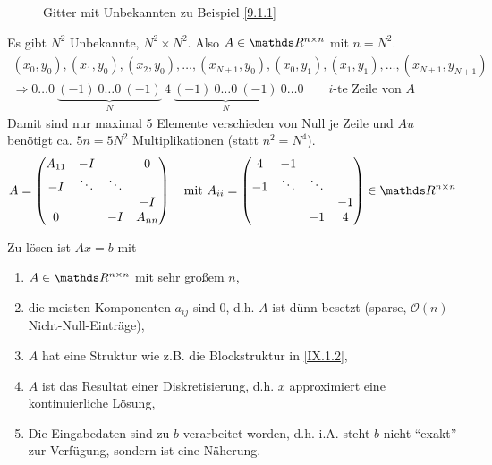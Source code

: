 \begin{Bspe}
\begin{figure}
\begin{image}{Gitter mit Unbekannten zu Beispiel \ref{9.1.1}}
    \end{image}\label{im9.1.2}
  \end{figure}
  Es gibt $N^2$ Unbekannte, $N^2\times N^2$.
  Also $A\in\R^{n\times n}$ mit $n=N^2$.
  \begin{gather*}
    (x_0,y_0),(x_1,y_0),(x_2,y_0),
    \dotsc,(x_{N+1},y_0),(x_0,y_1),(x_1,y_1),
    \dotsc,(x_{N+1},y_{N+1})\\
    \Rightarrow 0\dotsc0~\underbrace{(-1)~0\dotsc0~(-1)}_{N}~4~
    \underbrace{(-1)~0\dotsc0~(-1)}_{N}~0\dotsc0
    \qquad \text{$i$-te Zeile von $A$}
  \end{gather*}
  Damit sind nur maximal 5 Elemente verschieden von Null je Zeile
  und $Au$ benötigt ca. $5n=5N^2$ Multiplikationen (statt $n^2=N^4$).
  \begin{gather}
    A=
    \begin{pmatrix}
      A_{11}&-I&&0\\
      -I &\ddots &\ddots \\
      && &-I\\
      0&&-I&A_{nn}    
    \end{pmatrix}
    \quad \text{mit }
    A_{ii}=\begin{pmatrix}
      4&-1\\
      -1&\ddots&\ddots\\
      &&&-1\\
      &&-1&4
    \end{pmatrix}\in\R^{n\times n}
    \label{IX.1.2}
  \end{gather}
\end{Bspe}

Zu lösen ist $Ax=b$ mit
\begin{enumerate}
\item $A\in\R^{n\times n}$ mit sehr großem  $n$,
\item die meisten Komponenten $a_{ij}$ sind 0,
  d.h. $A$ ist dünn besetzt
  (sparse, $\mathcal{O}(n)$ Nicht-Null-Einträge),
\item $A$ hat eine Struktur wie z.B. die Blockstruktur in \eqref{IX.1.2},
\item $A$ ist das Resultat einer Diskretisierung, 
  d.h. $x$ approximiert eine kontinuierliche Lösung,
\item Die Eingabedaten sind zu $b$ verarbeitet worden, 
  d.h. i.A. steht $b$ nicht \enquote{exakt} zur Verfügung, 
  sondern ist eine Näherung.
\end{enumerate}


